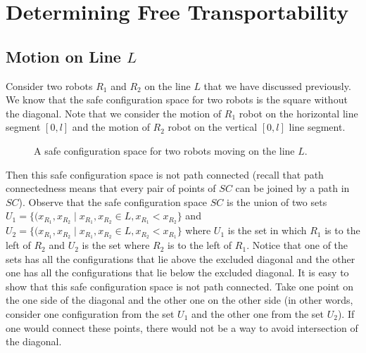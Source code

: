 \documentclass[12pt]{article}
\theoremstyle{definition}
\begin{document}

\section*{\centering Determining Free Transportability}

\subsection*{\centering Motion on Line $L$}

Consider two robots $R_1$ and $R_2$ on the line $L$ that we have discussed previously.
We know that the safe configuration space for two robots is the square without the diagonal.
Note that we consider the motion of $R_1$ robot on the horizontal line segment $[0, l]$
and the motion of $R_2$ robot on the vertical $[0, l]$ line segment.

\begin{figure}[H]
    \centering
    \caption*{A safe configuration space for two robots moving on the line $L$.}
\end{figure}

Then this safe configuration space is not path connected (recall that path connectedness
means that every pair of points of $SC$ can be joined by a path in $SC$). Observe that the safe configuration
space $SC$ is the union of two sets $U_1 = \{(x_{R_1}, x_{R_2} \mid x_{R_1}, x_{R_2} \in L, x_{R_1} < x_{R_2}\}$
and $U_2 = \{(x_{R_1}, x_{R_2} \mid x_{R_1}, x_{R_2} \in L, x_{R_2} < x_{R_1}\}$ where $U_1$ is the set in which $R_1$
is to the left of $R_2$ and $U_2$ is the set where $R_2$ is to the left of $R_1$. Notice that one of the sets has all
the configurations that lie above the excluded diagonal and the other one has all the configurations that lie below the
excluded diagonal. It is easy to show that this safe configuration space is not path connected. Take one point on the
one side of the diagonal and the other one on the other side (in other words, consider one configuration from the set
$U_1$ and the other one from the set $U_2$). If one would connect these points, there would not be a way to avoid
intersection of the diagonal.
\end{document}
